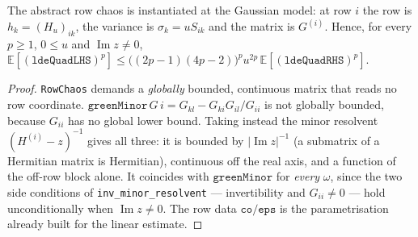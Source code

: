 \begin{lemma}\label{lem:lde-quad-inst}
  \leanok{}
  The abstract row chaos is instantiated at the Gaussian model: at row $i$ the row is
  $h_k=(H_u)_{ik}$, the variance is $\sigma_k=uS_{ik}$ and the matrix is $G^{(i)}$.  Hence,
  for every $p\ge1$, $0\le u$ and $\operatorname{Im}z\ne0$,
  $\mathbb E[(\mathtt{ldeQuadLHS})^p]\le\bigl((2p-1)(4p-2)\bigr)^p u^{2p}\,
  \mathbb E[(\mathtt{ldeQuadRHS})^p]$.
\end{lemma}
\begin{proof}\leanok
  \texttt{RowChaos} demands a \emph{globally} bounded, continuous matrix that reads no row
  coordinate.  $\mathtt{greenMinor}\,G\,i=G_{kl}-G_{ki}G_{il}/G_{ii}$ is not globally bounded,
  because $G_{ii}$ has no global lower bound.  Taking instead the minor resolvent
  $(H^{(i)}-z)^{-1}$ gives all three: it is bounded by $|\operatorname{Im}z|^{-1}$ (a submatrix
  of a Hermitian matrix is Hermitian), continuous off the real axis, and a function of the
  off-row block alone.  It coincides with $\mathtt{greenMinor}$ for \emph{every} $\omega$,
  since the two side conditions of \texttt{inv\_minor\_resolvent} --- invertibility and
  $G_{ii}\ne0$ --- hold unconditionally when $\operatorname{Im}z\ne0$.  The row data
  $\mathtt{co}/\mathtt{eps}$ is the parametrisation already built for the linear estimate.
\end{proof}

